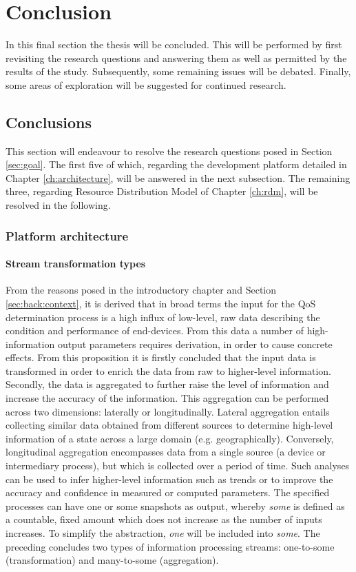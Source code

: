 \chapter{Conclusion}
In this final section the thesis will be concluded. This will be performed by first revisiting the research questions and answering them as well as permitted by the results of the study. Subsequently, some remaining issues will be debated. Finally, some areas of exploration will be suggested for continued research.

\section{Conclusions}
\label{sec:conclusions}
This section will endeavour to resolve the research questions posed in Section \ref{sec:goal}. The first five of which, regarding the development platform detailed in Chapter \ref{ch:architecture}, will be answered in the next subsection. The remaining three, regarding Resource Distribution Model of Chapter \ref{ch:rdm}, will be resolved in the following.
\subsection{Platform architecture}
\subsubsection{Stream transformation types}
From the reasons posed in the introductory chapter and Section \ref{sec:back:context}, it is derived that in broad terms the input for the QoS determination process is a high influx of low-level, raw data describing the condition and performance of end-devices. From this data a number of high-information output parameters requires derivation, in order to cause concrete effects. From this proposition it is firstly concluded that the input data is transformed in order to enrich the data from raw to higher-level information. Secondly, the data is aggregated to further raise the level of information and increase the accuracy of the information. This aggregation can be performed across two dimensions: laterally or longitudinally. Lateral aggregation entails collecting similar data obtained from different sources to determine high-level information of a state across a large domain (e.g. geographically). Conversely, longitudinal aggregation encompasses data from a single source (a device or intermediary process), but which is collected over a period of time. Such analyses can be used to infer higher-level information such as trends or to improve the accuracy and confidence in measured or computed parameters. The specified processes can have one or some snapshots as output, whereby \emph{some} is defined as a countable, fixed amount which does not increase as the number of inputs increases. To simplify the abstraction, \emph{one} will be included into \emph{some}. The preceding concludes two types of information processing streams: one-to-some (transformation) and many-to-some (aggregation).

